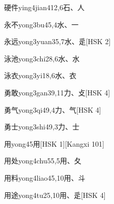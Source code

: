 \begin{entry}{硬件}{ying4jian4}{12,6}{⽯、⼈}
\end{entry}

\begin{entry}{永不}{yong3bu4}{5,4}{⽔、⼀}
\end{entry}

\begin{entry}{永远}{yong3yuan3}{5,7}{⽔、⾡}[HSK 2]
\end{entry}

\begin{entry}{泳池}{yong3chi2}{8,6}{⽔、⽔}
\end{entry}

\begin{entry}{泳衣}{yong3yi1}{8,6}{⽔、⾐}
\end{entry}

\begin{entry}{勇敢}{yong3gan3}{9,11}{⼒、⽁}[HSK 4]
\end{entry}

\begin{entry}{勇气}{yong3qi4}{9,4}{⼒、⽓}[HSK 4]
\end{entry}

\begin{entry}{勇士}{yong3shi4}{9,3}{⼒、⼠}
\end{entry}

\begin{entry}{用}{yong4}{5}{⽤}[HSK 1][Kangxi 101]
\end{entry}

\begin{entry}{用处}{yong4chu5}{5,5}{⽤、⼡}
\end{entry}

\begin{entry}{用料}{yong4liao4}{5,10}{⽤、⽃}
\end{entry}

\begin{entry}{用途}{yong4tu2}{5,10}{⽤、⾡}[HSK 4]
\end{entry}

